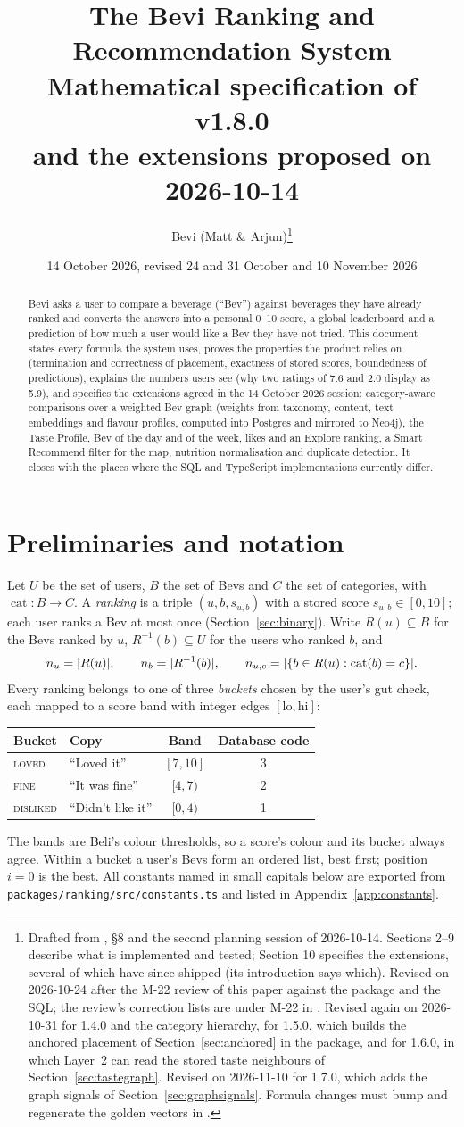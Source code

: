 \documentclass[11pt]{article}
\title{\textbf{The Bevi Ranking and Recommendation System}\\[4pt]
\large Mathematical specification of \code{@bevi/ranking} v1.8.0\\ and the extensions proposed on 2026-10-14}
\author{Bevi (Matt \& Arjun)\thanks{Drafted from \code{packages/ranking/src}, \code{DEVELOPMENT-MATT.md} \S 8 and the second planning session of 2026-10-14. Sections 2--9 describe what is implemented and tested; Section 10 specifies the extensions, several of which have since shipped (its introduction says which). Revised on 2026-10-24 after the M-22 review of this paper against the package and the SQL; the review's correction lists are under M-22 in \code{TASKS.md}. Revised again on 2026-10-31 for \code{RANKING\_VERSION} 1.4.0 and the category hierarchy, for 1.5.0, which builds the anchored placement of Section~\ref{sec:anchored} in the package, and for 1.6.0, in which Layer~2 can read the stored taste neighbours of Section~\ref{sec:tastegraph}. Revised on 2026-11-10 for 1.7.0, which adds the graph signals of Section~\ref{sec:graphsignals}. Formula changes must bump \code{RANKING\_VERSION} and regenerate the golden vectors in \code{shared/fixtures}.}}
\date{14 October 2026, revised 24 and 31 October and 10 November 2026}
\DeclarePairedDelimiter\abs{\lvert}{\rvert}
\DeclareMathOperator{\cat}{cat}
\newcommand{\code}[1]{\texttt{#1}}
\theoremstyle{plain}
\theoremstyle{definition}
\theoremstyle{remark}
\begin{document}
\maketitle

\begin{abstract}
Bevi asks a user to compare a beverage (``Bev'') against beverages they have already ranked and converts the answers into a personal 0--10 score, a global leaderboard and a prediction of how much a user would like a Bev they have not tried. This document states every formula the system uses, proves the properties the product relies on (termination and correctness of placement, exactness of stored scores, boundedness of predictions), explains the numbers users see (why two ratings of 7.6 and 2.0 display as 5.9), and specifies the extensions agreed in the 14 October 2026 session: category-aware comparisons over a weighted Bev graph (weights from taxonomy, content, text embeddings and flavour profiles, computed into Postgres and mirrored to Neo4j), the Taste Profile, Bev of the day and of the week, likes and an Explore ranking, a Smart Recommend filter for the map, nutrition normalisation and duplicate detection. It closes with the places where the SQL and TypeScript implementations currently differ.
\end{abstract}

\tableofcontents

\section{Preliminaries and notation}\label{sec:notation}

Let $U$ be the set of users, $B$ the set of Bevs and $C$ the set of categories, with $\cat : B \to C$. A \emph{ranking} is a triple $(u, b, s_{u,b})$ with a stored score $s_{u,b} \in [0, 10]$; each user ranks a Bev at most once (Section~\ref{sec:binary}). Write $R(u) \subseteq B$ for the Bevs ranked by $u$, $R^{-1}(b) \subseteq U$ for the users who ranked $b$, and
\[
n_u = \abs{R(u)}, \qquad n_b = \abs{R^{-1}(b)}, \qquad n_{u,c} = \abs{\{ b \in R(u) : \cat(b) = c \}}.
\]
Every ranking belongs to one of three \emph{buckets} chosen by the user's gut check, each mapped to a score band with integer edges $[\mathrm{lo}, \mathrm{hi}]$:
\begin{center}
\begin{tabular}{@{}llcc@{}}
\toprule
Bucket & Copy & Band & Database code \\
\midrule
\textsc{loved} & ``Loved it'' & $[7, 10]$ & 3 \\
\textsc{fine} & ``It was fine'' & $[4, 7)$ & 2 \\
\textsc{disliked} & ``Didn't like it'' & $[0, 4)$ & 1 \\
\bottomrule
\end{tabular}
\end{center}
The bands are Beli's colour thresholds, so a score's colour and its bucket always agree. Within a bucket a user's Bevs form an ordered list, best first; position $i = 0$ is the best. All constants named in small capitals below are exported from \code{packages/ranking/src/constants.ts} and listed in Appendix~\ref{app:constants}.
\end{document}
